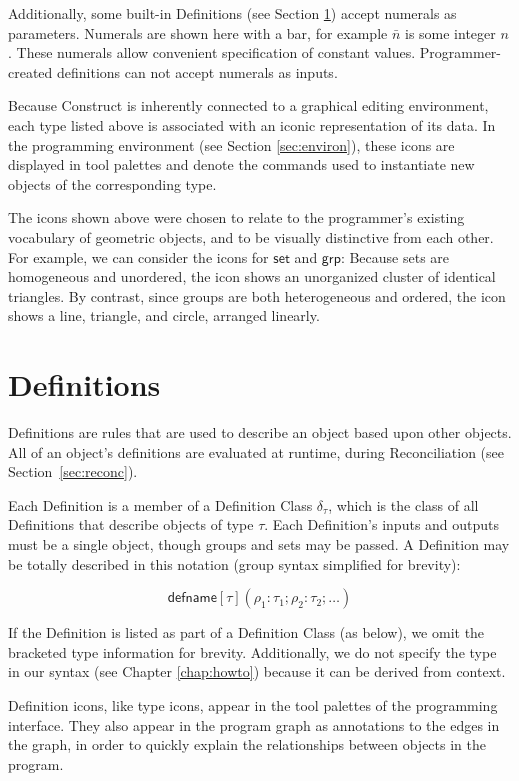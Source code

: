 \documentclass[twoside,11pt]{report}
\begin{document}
Additionally, some built-in Definitions (see Section \ref{sec:def}) accept numerals as parameters. 
Numerals are shown here with a bar, for example $\bar{n}$ is some integer $n$.
These numerals allow convenient specification of constant values. 
Programmer-created definitions can not accept numerals as inputs. 

Because Construct is inherently connected to a graphical editing environment, each type listed above is associated with an iconic representation of its data.
In the programming environment (see Section \ref{sec:environ}), these icons are displayed in tool palettes and denote the commands used to instantiate new objects of the corresponding type.

The icons shown above were chosen to relate to the programmer's existing vocabulary of geometric objects, and to be visually distinctive from each other. 
For example, we can consider the icons for $\mathsf{set}$ and $\mathsf{grp}$: Because sets are homogeneous and unordered, the icon shows an unorganized cluster of identical triangles. 
By contrast, since groups are both heterogeneous and ordered, the icon shows a line, triangle, and circle, arranged linearly.

\section{Definitions}
\label{sec:def}

Definitions are rules that are used to describe an object based upon other objects. 
All of an object's definitions are evaluated at runtime, during Reconciliation (see Section~\ref{sec:reconc}). 

Each Definition is a member of a Definition Class $\delta_\tau$, which is the class of all Definitions that describe objects of type $\tau$. 
Each Definition's inputs and outputs must be a single object, though groups and sets may be passed.
A Definition may be totally described in this notation (group syntax simplified for brevity): 

$$\mathsf{defname}[\tau](\rho_1 : \tau_1; \rho_2 : \tau_2; \dots)$$

If the Definition is listed as part of a Definition Class (as below), we omit the bracketed type information for brevity. 
Additionally, we do not specify the type in our syntax (see Chapter \ref{chap:howto}) because it can be derived from context.

Definition icons, like type icons, appear in the tool palettes of the programming interface. 
They also appear in the program graph as annotations to the edges in the graph, in order to quickly explain the relationships between objects in the program.
\end{document}
